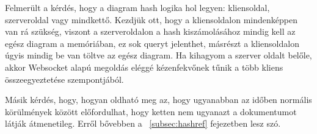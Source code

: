 Felmerült a kérdés, hogy a diagram hash logika hol legyen: kliensoldal, szerveroldal vagy mindkettő. Kezdjük ott, hogy a kliensoldalon mindenképpen van rá szükség, viszont a szerveroldalon a hash kiszámolásához mindig kell az egész diagram a memóriában, ez sok queryt jelenthet, másrészt a kliensoldalon úgyis mindig be van töltve az egész diagram. Ha kihagyom a szerver oldalt belőle, akkor Websocket alapú megoldás eléggé kézenfekvőnek tűnik a több kliens összeegyeztetése szempontjából.

Másik kérdés, hogy, hogyan oldható meg az, hogy ugyanabban az időben normális körülmények között előfordulhat, hogy ketten nem ugyanazt a dokumentumot látják átmenetileg. Erről bővebben a ~\ref{subsec:hashref} fejezetben lesz szó.

